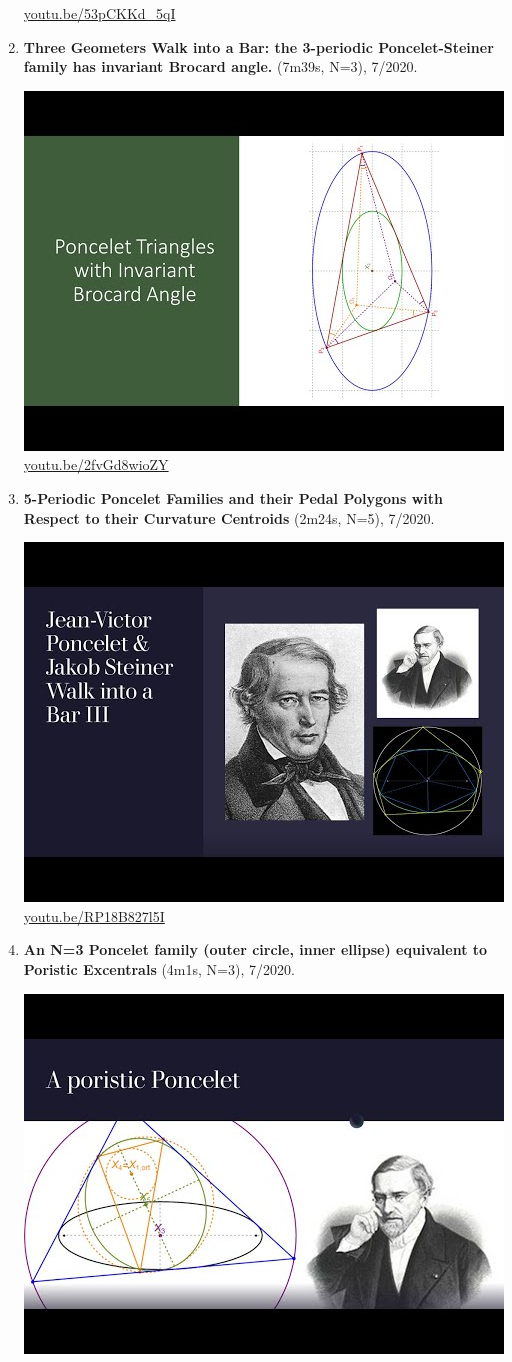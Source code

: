 \documentclass[12pt]{amsart}
\begin{document}
\begin{enumerate}[resume]
\begin{center}
\href{https://youtu.be/53pCKKd_5qI}{\url{youtu.be/53pCKKd\_5qI}}\end{center}
% 
\item \textbf{Three Geometers Walk into a Bar: the 3-periodic Poncelet-Steiner family has invariant Brocard angle.} (7m39s, N=3), 7/2020. 
\begin{center}\includegraphics[width=.5\textwidth]{pics/2fvGd8wioZY.jpg} \\ 
\href{https://youtu.be/2fvGd8wioZY}{\url{youtu.be/2fvGd8wioZY}}\end{center}
% 
\item \textbf{5-Periodic Poncelet Families and their Pedal Polygons with Respect to their Curvature Centroids} (2m24s, N=5), 7/2020. 
\begin{center}\includegraphics[width=.5\textwidth]{pics/RP18B827l5I.jpg} \\ 
\href{https://youtu.be/RP18B827l5I}{\url{youtu.be/RP18B827l5I}}\end{center}
% 
\item \textbf{An N=3 Poncelet family (outer circle, inner ellipse) equivalent to Poristic Excentrals} (4m1s, N=3), 7/2020. 
\begin{center}\includegraphics[width=.5\textwidth]{pics/wUu2iMesv3U.jpg} \\ 

\end{center}
\end{enumerate}
\end{document}
